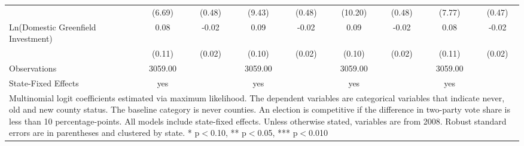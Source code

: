 \begin{table}[!htbp]
\begin{tabular}{l*{8}{c}}
                    &      (6.69)   &      (0.48)   &      (9.43)   &      (0.48)   &     (10.20)   &      (0.48)   &      (7.77)   &      (0.47)   \\
Ln(Domestic Greenfield Investment)&        0.08   &       -0.02   &        0.09   &       -0.02   &        0.09   &       -0.02   &        0.08   &       -0.02   \\
                    &      (0.11)   &      (0.02)   &      (0.10)   &      (0.02)   &      (0.10)   &      (0.02)   &      (0.11)   &      (0.02)   \\
\hline
Observations        &     3059.00   &               &     3059.00   &               &     3059.00   &               &     3059.00   &               \\
State-Fixed Effects &         yes   &               &         yes   &               &         yes   &               &         yes   &               \\
\hline\hline
\multicolumn{9}{p{\linewidth}}{\footnotesize Multinomial logit coefficients estimated via maximum likelihood. The dependent variables are categorical variables that indicate never, old and new county status. The baseline category is never counties. An election is competitive if the difference in two-party vote share is less than 10 percentage-points. All models include state-fixed effects. Unless otherwise stated, variables are from 2008. Robust standard errors are in parentheses and clustered by state. * p$<$0.10, ** p$<$0.05, *** p$<$0.010}\\
\end{tabular}
\end{table}
